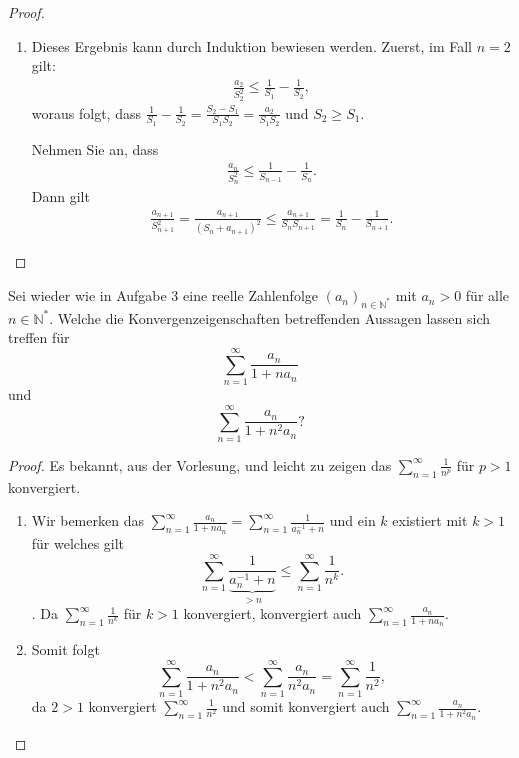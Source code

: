 \documentclass{../problemset}
\begin{document}
\begin{problem}
\begin{proof}
\begin{enumerate}
		\item

		      Dieses Ergebnis kann durch Induktion bewiesen werden. Zuerst, im Fall $n=2$ gilt:
		      \begin{align*}
			      \frac{a_2}{S^2_{2}} \leq \frac{1}{S_{1}}-\frac{1}{S_{2}},
		      \end{align*}
		      woraus folgt, dass $\frac{1}{S_{1}}-\frac{1}{S_{2}}= \frac{S_2-S_1}{S_1S_{2}}=\frac{a_2}{S_1S_{2}}$ und $S_2 \geq S_1$.

		      Nehmen Sie an, dass
		      \begin{align*}
			      \frac{a_n}{S^2_{n}} \leq \frac{1}{S_{n-1}}-\frac{1}{S_{n}}.
		      \end{align*}
		      Dann gilt
		      \begin{align*}
			      \frac{a_{n+1}}{S^2_{n+1}} = \frac{a_{n+1}}{(S_{n}+a_{n+1})^2} \leq  \frac{a_{n+1}}{S_{n}S_{n+1}}=\frac{1}{S_{n}}-\frac{1}{S_{n+1}}.
		      \end{align*}
		      \checkmark
	\end{enumerate}
\end{proof}
\end{problem}

\pagebreak

\begin{problem}[Konvergenzeigenschaften]
Sei wieder wie in Aufgabe 3 eine reelle Zahlenfolge $(a_n)_{n\in\mathbb{N}^*}$ mit $a_n > 0$ für alle $n \in \mathbb{N}^*$. Welche die Konvergenzeigenschaften betreffenden Aussagen lassen sich treffen für
\[
	\sum_{n=1}^{\infty} \frac{a_n}{1 + n a_n}
\]
und
\[
	\sum_{n=1}^{\infty} \frac{a_n}{1 + n^2 a_n}?
\]
\end{problem}
\begin{proof}
	Es bekannt, aus der Vorlesung, und leicht zu zeigen das $\sum_{n=1}^{\infty}\frac{1}{n^p}$ für $p > 1$ konvergiert.
	\begin{enumerate}
		\item Wir bemerken das $\sum_{n=1}^{\infty} \frac{a_n}{1 + n a_n} = \sum_{n=1}^{\infty} \frac{1}{a_n^{-1} + n}$ und ein $k$ existiert mit $k > 1$ für welches gilt \[
			      \sum_{n=1}^{\infty} \frac{1}{\underbrace{a_n^{-1} + n}_{> n}} \le \sum_{n=1}^{\infty} \frac{1}{n^k}.
		      \]. Da $\sum_{n=1}^{\infty} \frac{1}{n^k}$ für $k > 1$ konvergiert, konvergiert auch $\sum_{n=1}^{\infty} \frac{a_n}{1 + n a_n}$.
		\item Somit folgt \[
			      \sum_{n=1}^{\infty} \frac{a_n}{1 + n^2 a_n} <	\sum_{n=1}^{\infty} \frac{a_n}{n^2 a_n} = \sum_{n=1}^{\infty} \frac{1}{n^2},
		      \] da $2 > 1$ konvergiert $\sum_{n=1}^{\infty} \frac{1}{n^2}$ und somit konvergiert auch $\sum_{n=1}^{\infty} \frac{a_n}{1 + n^2 a_n}$.
	\end{enumerate}
\end{proof}
\end{document}

